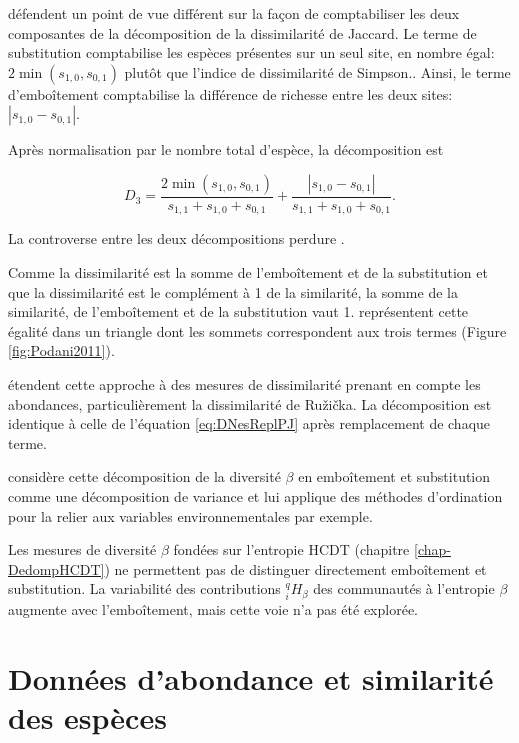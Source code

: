 \documentclass[
  11pt,
  french,
  a4paper,
  extrafontsizes,onecolumn,openright
  ]{memoir}
\begin{document}
\normalsize

\textcite{Podani2011} défendent un point de vue différent sur la façon de comptabiliser les deux composantes de la décomposition de la dissimilarité de Jaccard.
Le terme de substitution comptabilise les espèces présentes sur un seul site, en nombre égal: \(2\min(s_{1,0},s_{0,1})\) plutôt que l'indice de dissimilarité de Simpson..
Ainsi, le terme d'emboîtement comptabilise la différence de richesse entre les deux sites: \(|s_{1,0}-s_{0,1}|\).

Après normalisation par le nombre total d'espèce, la décomposition est

\begin{equation}
  \label{eq:DNesReplPJ}
  D_3
  = \frac{2\min(s_{1,0},s_{0,1})}{s_{1,1} + s_{1,0} + s_{0,1}}
  + \frac{|s_{1,0}-s_{0,1}|}{s_{1,1} + s_{1,0} + s_{0,1}}.
\end{equation}

La controverse entre les deux décompositions perdure \autocite{Podani2016}.

Comme la dissimilarité est la somme de l'emboîtement et de la substitution et que la dissimilarité est le complément à 1 de la similarité, la somme de la similarité, de l'emboîtement et de la substitution vaut 1.
\textcite{Podani2011} représentent cette égalité dans un triangle dont les sommets correspondent aux trois termes (Figure \ref{fig:Podani2011}).

\textcite{Podani2013} étendent cette approche à des mesures de dissimilarité prenant en compte les abondances, particulièrement la dissimilarité de Ružička.
La décomposition est identique à celle de l'équation \eqref{eq:DNesReplPJ} après remplacement de chaque terme.

\textcite{Legendre2014} considère cette décomposition de la diversité \(\beta\) en emboîtement et substitution comme une décomposition de variance et lui applique des méthodes d'ordination pour la relier aux variables environnementales par exemple.

Les mesures de diversité \(\beta\) fondées sur l'entropie HCDT (chapitre \ref{chap-DedompHCDT}) ne permettent pas de distinguer directement emboîtement et substitution.
La variabilité des contributions \(^{q}_{i}\!H_{\beta}\) des communautés à l'entropie \(\beta\) augmente avec l'emboîtement, mais cette voie n'a pas été explorée.

\hypertarget{donnuxe9es-dabondance-et-similarituxe9-des-espuxe8ces}{%
\section{Données d'abondance et similarité des espèces}\label{donnuxe9es-dabondance-et-similarituxe9-des-espuxe8ces}}
\end{document}
